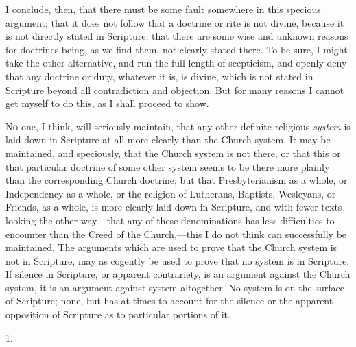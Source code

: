 I conclude, then, that there must be some fault somewhere in this
specious argument; that it does not follow that a doctrine or rite is
not divine, because it is not directly stated in Scripture; that there
are some wise and unknown reasons for doctrines being, as we find
them, not clearly stated there. To be sure, I might take the other
alternative, and run the full length of scepticism, and openly deny
that any doctrine or duty, whatever it is, is divine, which is not
stated in Scripture beyond all contradiction and objection. But for
many reasons I cannot get myself to do this, as I shall proceed to
show.


N\textsc{o} one, I think, will seriously maintain, that any other
definite religious \emph{system} is laid down in Scripture at all more
clearly than the Church system. It may be maintained, and speciously,
that the Church system is not there, or that this or that particular
doctrine of some other system seems to be there more plainly than the
corresponding Church doctrine; but that Presbyterianism as a whole, or
Independency as a whole, or the religion of Lutherans, Baptists,
Wesleyans, or Friends, as a whole, is more clearly laid down in
Scripture, and with fewer texts looking the other way—that any of
these denominations has less difficulties to encounter than the Creed
of the Church,—this I do not think can successfully be maintained.
The arguments which are used to prove that the Church system is not in
Scripture, may as cogently be used to prove that no system is in
Scripture. If silence in Scripture, or apparent contrariety, is an
argument against the Church system, it is an argument against system
altogether. No system is on the surface of Scripture; none, but has at
times to account for the silence or the apparent opposition of
Scripture as to particular portions of it.

1.


